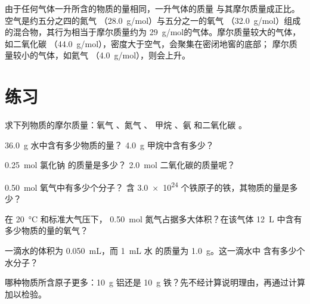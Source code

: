 \begin{remark}[重气体与轻气体]\label{rem:g10:the-mole:heavy}
由于任何气体一升所含的物质的量相同，一升气体的质量
与其摩尔质量成正比。空气是约五分之四的氮气
（\qty{28.0}{g/mol}）与五分之一的氧气
（\qty{32.0}{g/mol}）组成的混合物，其行为相当于摩尔质量约为
\qty{29}{g/mol}的气体。摩尔质量较大的气体，如二氧化碳
（\qty{44.0}{g/mol}），密度大于空气，会聚集在密闭地窖的底部；
摩尔质量较小的气体，如氦气
（\qty{4.0}{g/mol}），则会上升。
\end{remark}

\section{练习}

\begin{exercise}[$\star$]\label{exo:g10:the-mole:1}
求下列物质的摩尔质量：氧气 、氮气 、
甲烷 、氨  和二氧化碳 。
\end{exercise}

\begin{exercise}[$\star$]\label{exo:g10:the-mole:2}
\qty{36.0}{g} 水中含有多少物质的量？
\qty{4.0}{g} 甲烷中含有多少？
\end{exercise}

\begin{exercise}[$\star$]\label{exo:g10:the-mole:3}
\qty{0.25}{mol} 氯化钠  的质量是多少？
\qty{2.0}{mol} 二氧化碳的质量呢？
\end{exercise}

\begin{exercise}[$\star$]\label{exo:g10:the-mole:4}
\qty{0.50}{mol} 氧气中有多少个分子？
含 \num{3.0e24} 个铁原子的铁，其物质的量是多少？
\end{exercise}

\begin{exercise}[$\star$]\label{exo:g10:the-mole:5}
在 \qty{20}{\celsius} 和标准大气压下，
\qty{0.50}{mol} 氮气占据多大体积？在该气体
\qty{12}{L} 中含有多少物质的量的氧气？
\end{exercise}

\begin{exercise}[$\star\star$]\label{exo:g10:the-mole:6}
一滴水的体积为 \qty{0.050}{mL}，而 \qty{1}{mL} 水
的质量为 \qty{1.0}{g}。这一滴水中
含有多少个水分子？
\end{exercise}

\begin{exercise}[$\star\star$]\label{exo:g10:the-mole:7}
哪种物质所含原子更多：\qty{10}{g} 铝还是 \qty{10}{g}
铁？先不经计算说明理由，再通过计算加以检验。
\end{exercise}

